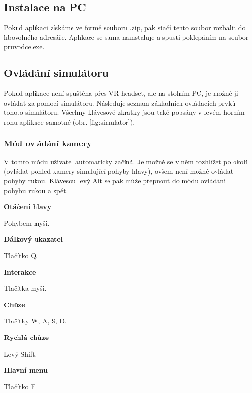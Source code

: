 \documentclass[thesis=B,czech]{FITthesis}[2012/06/26]
\begin{document}
\subsection{Instalace na PC}	
	Pokud aplikaci získáme ve formě souboru .zip, pak stačí tento soubor rozbalit do libovolného adresáře. Aplikace se sama nainstaluje a spustí poklepáním na soubor pruvodce.exe.
	
\subsection{Ovládání simulátoru}
Pokud aplikace není spuštěna přes VR headset, ale na stolním PC, je možné ji ovládat za pomocí simulátoru.\cite{VRTK} Následuje seznam základních ovládacích prvků tohoto simulátoru. Všechny klávesové zkratky jsou také popsány v levém horním rohu aplikace samotné (obr. \ref{fig:simulator}).

\subsubsection{Mód ovládání kamery}
V tomto módu uživatel automaticky začíná. Je možné se v něm rozhlížet po okolí (ovládat pohled kamery simulující pohyby hlavy), ovšem není možné ovládat pohyby rukou. Klávesou levý Alt se pak může přepnout do módu ovládání pohybu rukou a zpět.


\begin{description}

	\item \textbf{Otáčení hlavy}
	
	Pohybem myši. 
	
	\item \textbf{Dálkový ukazatel}
	
	Tlačítko Q.		
	
	\item \textbf{Interakce}
	
	Tlačítka myši.
	
	
	\item \textbf{Chůze}
	
	Tlačítky W, A, S, D.	
	
	
	\item \textbf{Rychlá chůze}
	
	Levý Shift.
	
	\item \textbf{Hlavní menu}
	
	Tlačítko F.
	
\end{description}
\end{document}
